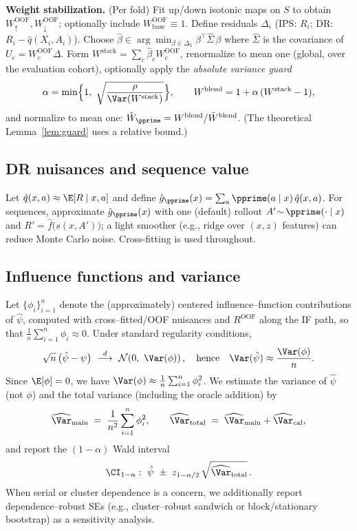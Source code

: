 \noindent\textbf{Weight stabilization.} (Per fold) Fit up/down isotonic maps on $S$ to obtain $W^{\mathrm{OOF}}_{\uparrow},W^{\mathrm{OOF}}_{\downarrow}$; optionally include $W^{\mathrm{OOF}}_{\mathrm{base}}\equiv 1$. Define residuals $\Delta_i$ (IPS: $R_i$; DR: $R_i-\hat q(X_i,A_i)$). Choose
$\hat\beta\in\arg\min_{\beta\in\Delta_3}\beta^\top \hat\Sigma\,\beta$ where $\hat\Sigma$ is the covariance of $U_c=W^{\mathrm{OOF}}_c \Delta$. Form $W^{\mathrm{stack}}=\sum_c \hat\beta_c W^{\mathrm{OOF}}_c$, renormalize to mean one (global, over the evaluation cohort), optionally apply the \emph{absolute variance guard}
\[
\alpha=\min\!\Big\{1,\ \sqrt{\frac{\rho}{\Var(W^{\mathrm{stack}})}}\Big\},\qquad
W^{\mathrm{blend}}=1+\alpha\,(W^{\mathrm{stack}}-1),
\]
and normalize to mean one: $\hat W_{\pprime}=W^{\mathrm{blend}}/\bar W^{\mathrm{blend}}$. (The theoretical Lemma~\ref{lem:guard} uses a relative bound.)

\subsection{DR nuisances and sequence value}
\label{app:nuisances}
Let $\hat q(x,a)\approx \E[R\mid x,a]$ and define $\hat g_{\pprime}(x)=\sum_a \pprime(a\mid x)\,\hat q(x,a)$. For sequences, approximate $\hat g_{\pprime}(x)$ with one (default) rollout $A'\!\sim\!\pprime(\cdot\mid x)$ and $R'=\hat f\!\big(s(x,A')\big)$; a light smoother (e.g., ridge over $(x,z)$ features) can reduce Monte Carlo noise. Cross-fitting is used throughout.

\subsection{Influence functions and variance}
\label{app:if-var}
Let $\{\phi_i\}_{i=1}^n$ denote the (approximately) centered influence–function contributions of $\hat\psi$, computed with cross–fitted/OOF nuisances and $R^{\mathrm{OOF}}$ along the IF path, so that $\frac{1}{n}\sum_{i=1}^n \phi_i \approx 0$. Under standard regularity conditions,
\[
\sqrt{n}\,\bigl(\hat\psi-\psi\bigr)\ \overset{d}{\longrightarrow}\ \mathcal{N}\!\left(0,\ \Var(\phi)\right),
\quad\text{hence}\quad
\Var(\hat\psi) \approx \frac{\Var(\phi)}{n}.
\]
Since $\E[\phi]=0$, we have $\Var(\phi)\approx \frac{1}{n}\sum_{i=1}^n \phi_i^2$. We estimate the variance of $\hat\psi$ (not $\phi$) and the total variance (including the oracle addition) by
\[
\widehat{\Var}_{\mathrm{main}}
\;=\;
\frac{1}{n^2}\sum_{i=1}^n \phi_i^2,
\qquad
\widehat{\Var}_{\mathrm{total}}
\;=\;
\widehat{\Var}_{\mathrm{main}}+\widehat{\Var}_{\mathrm{cal}},
\]
and report the $(1-\alpha)$ Wald interval
\[
\CI_{1-\alpha}:\ \hat\psi \ \pm\ z_{1-\alpha/2}\,\sqrt{\widehat{\Var}_{\mathrm{total}}}\,.
\]
When serial or cluster dependence is a concern, we additionally report dependence–robust SEs (e.g., cluster–robust sandwich or block/stationary bootstrap) as a sensitivity analysis.


